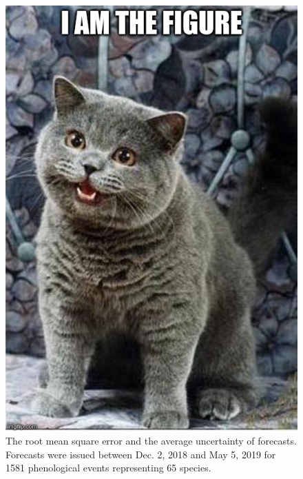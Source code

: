 \begin{figure}
	\centering
		\includegraphics[scale=0.3]{images/figure_filler.jpg}
	\caption[The root mean square error and the average uncertainty of forecasts]{The root mean square error and the average uncertainty of forecasts. Forecasts were issued between Dec. 2, 2018 and May 5, 2019 for 1581 phenological events representing 65 species. } \label{fig-4-4}
\end{figure}

